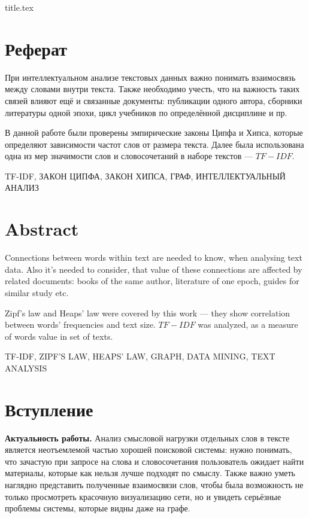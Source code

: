 



{title.tex}

\clearpage
\setcounter{page}{2}

\tableofcontents
\thispagestyle{empty}

\clearpage
\pagestyle{fancy}

\clearpage

\chapter*{Реферат}

При интеллектуальном анализе текстовых данных важно понимать взаимосвязь между
словами внутри текста.
Также необходимо учесть, что на важность таких связей влияют ещё и связанные
документы: публикации одного автора, сборники литературы одной эпохи,
цикл учебников по определённой дисциплине и пр.

В данной работе были проверены эмпирические законы Ципфа и Хипса,
которые определяют зависимости частот слов от размера текста.
Далее была использована одна из мер значимости слов и словосочетаний в наборе
текстов --- $TF-IDF$.

\MakeUppercase{TF-IDF, закон Ципфа, закон Хипса, граф, интеллектуальный анализ}
\clearpage

\chapter*{Abstract}

Connections between words within text are needed to know, when analysing text
data.
Also it's needed to consider, that value of these connections are affected
by related documents: books of the same author, literature of one epoch,
guides for similar study etc.

Zipf's law and Heaps' law were covered by this work --- they show
correlation between words' frequencies and text size.
$TF-IDF$ was analyzed, as a measure of words value in set of texts.

\MakeUppercase{TF-IDF, Zipf's law, Heaps' law, graph, data mining,
text analysis}

\clearpage
\chapter*{Вступление}

\textbf{Актуальность работы.}
Анализ смысловой нагрузки отдельных слов в тексте является неотъемлемой частью
хорошей поисковой системы:
нужно понимать, что зачастую при запросе на слова и словосочетания пользователь
ожидает найти материалы, которые как нельзя лучше подходят по смыслу.
Также важно уметь наглядно представить полученные взаимосвязи слов,
чтобы была возможность не только просмотреть красочную визуализацию сети,
но и увидеть серьёзные проблемы системы, которые видны даже на графе.

